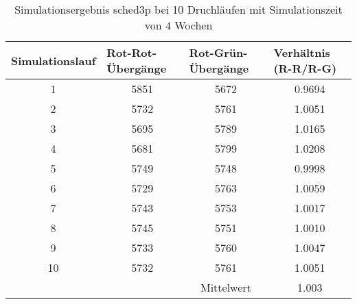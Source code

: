 \documentclass[11pt, a4paper]{article}
\begin{document}
\begin{table}[H]
\centering
\begin{tabular}{cc|c|c|}
\hline
\multicolumn{1}{|l|}{Simulationslauf} & \multicolumn{1}{l|}{Rot-Rot-Übergänge} & \multicolumn{1}{l|}{Rot-Grün-Übergänge} & \multicolumn{1}{l|}{Verhältnis (R-R/R-G)} \\ \hline
\multicolumn{1}{|c|}{1}               & 5851                                   & 5672                                    & 0.9694                                    \\ \hline
\multicolumn{1}{|c|}{2}               & 5732                                   & 5761                                    & 1.0051                                    \\ \hline
\multicolumn{1}{|c|}{3}               & 5695                                   & 5789                                    & 1.0165                                    \\ \hline
\multicolumn{1}{|c|}{4}               & 5681                                   & 5799                                    & 1.0208                                    \\ \hline
\multicolumn{1}{|c|}{5}               & 5749                                   & 5748                                    & 0.9998                                    \\ \hline
\multicolumn{1}{|c|}{6}               & 5729                                   & 5763                                    & 1.0059                                    \\ \hline
\multicolumn{1}{|c|}{7}               & 5743                                   & 5753                                    & 1.0017                                    \\ \hline
\multicolumn{1}{|c|}{8}               & 5745                                   & 5751                                    & 1.0010                                    \\ \hline
\multicolumn{1}{|c|}{9}               & 5733                                   & 5760                                    & 1.0047                                    \\ \hline
\multicolumn{1}{|c|}{10}              & 5732                                   & 5761                                    & 1.0051                                    \\ \hline
\multicolumn{1}{l}{}                  & \multicolumn{1}{l|}{}                  & Mittelwert                              & 1.003                                     \\ \cline{3-4}
\end{tabular}
\caption{Simulationsergebnis sched3p bei 10 Druchläufen mit Simulationszeit von $4$ Wochen}
\end{table}
\end{document}
